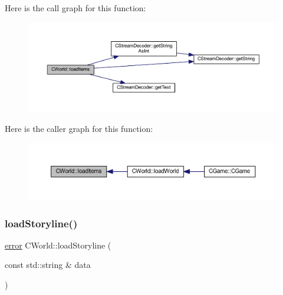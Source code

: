 Here is the call graph for this function\+:\nopagebreak
\begin{figure}[H]
\begin{center}
\leavevmode
\includegraphics[width=350pt]{class_c_world_abb7ab3f5626b424ebabbd4aec3b60b5a_cgraph}
\end{center}
\end{figure}
Here is the caller graph for this function\+:\nopagebreak
\begin{figure}[H]
\begin{center}
\leavevmode
\includegraphics[width=350pt]{class_c_world_abb7ab3f5626b424ebabbd4aec3b60b5a_icgraph}
\end{center}
\end{figure}
\mbox{\label{class_c_world_a6a4774ff3ee94df11d82260a27065885}} 
\subsubsection{\texorpdfstring{load\+Storyline()}{loadStoryline()}}
{\footnotesize\ttfamily \mbox{\hyperlink{_errors_list_8h_af10dacfa214e2575bb2e0ee407c242e0}{error}} C\+World\+::load\+Storyline (\begin{DoxyParamCaption}\item[{const std\+::string \&}]{data }\end{DoxyParamCaption})\hspace{0.3cm}{\ttfamily [protected]}}

